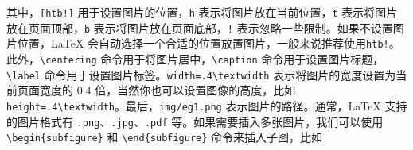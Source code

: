 其中，\texttt{[htb!]} 用于设置图片的位置，\texttt{h} 表示将图片放在当前位置，\texttt{t} 表示将图片放在页面顶部，\texttt{b} 表示将图片放在页面底部，\texttt{!} 表示忽略一些限制。如果不设置图片位置，LaTeX 会自动选择一个合适的位置放置图片，一般来说推荐使用\texttt{htb!}。此外，\texttt{\textbackslash centering} 命令用于将图片居中，\texttt{\textbackslash caption} 命令用于设置图片标题，\texttt{\textbackslash label} 命令用于设置图片标签。\texttt{width=.4\textbackslash textwidth} 表示将图片的宽度设置为当前页面宽度的 0.4 倍，当然你也可以设置图像的高度，比如 \texttt{height=.4\textbackslash textwidth}。最后，\texttt{img/eg1.png} 表示图片的路径。通常，LaTeX 支持的图片格式有 \texttt{.png}、\texttt{.jpg}、\texttt{.pdf} 等。如果需要插入多张图片，我们可以使用 \texttt{\textbackslash begin\{subfigure\}} 和 \texttt{\textbackslash end\{subfigure\}} 命令来插入子图，比如

